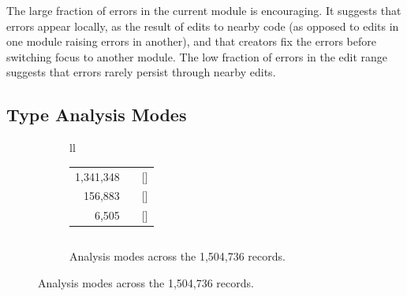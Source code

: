 \documentclass[english,submission,cleveref]{programming}
\begin{document}
The large fraction of errors in the current module is encouraging.
It suggests that errors appear locally, as the result of edits to nearby
code (as opposed to edits in one module raising errors in another), and
that creators fix the errors before switching focus to another
module.
The low fraction of errors in the edit range suggests that errors rarely
persist through nearby edits.


\subsection{Type Analysis Modes}
\label{s:type-analysis-modes}

\begin{figure}[t]\centering
  \begin{subfigure}[t]{\columnwidth}
    \begin{tabular}[t]{ll}
      \begin{tabular}[t]{r@{~~}l@{~}r}
         1,341,348 & \mnocheck{}          & [\pct{89.14}] \\
           156,883 & \mnonstrict{}        & [\pct{10.43}] \\
             6,505 & \mstrict{}           & [\pct{ 0.43}]
      \end{tabular}
      \begin{tabular}[t]{r@{~~}l@{~~}r}
      \end{tabular}
    \end{tabular}
    \caption{Analysis modes across the 1,504,736 records.}
    \label{f:total-records}
  \end{subfigure}


\end{figure}
\end{document}
